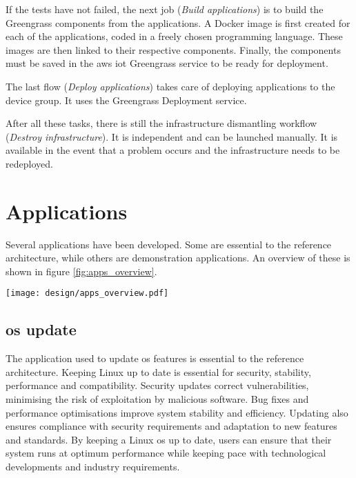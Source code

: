 If the tests have not failed, the next job (\textit{Build applications}) is to build the Greengrass components from the applications. A Docker image is first created for each of the applications, coded in a freely chosen programming language. These images are then linked to their respective components. Finally, the components must be saved in the \gls{aws} \acrshort{iot} Greengrass service to be ready for deployment.

The last flow (\textit{Deploy applications}) takes care of deploying applications to the device group. It uses the Greengrass Deployment service.

After all these tasks, there is still the infrastructure dismantling workflow (\textit{Destroy infrastructure}). It is independent and can be launched manually. It is available in the event that a problem occurs and the infrastructure needs to be redeployed.

\section{Applications}

Several applications have been developed. Some are essential to the reference architecture, while others are demonstration applications. An overview of these is shown in figure \ref{fig:apps_overview}.
\begin{center}
    \begingroup
    \texttt{[image: design/apps\_overview.pdf]}
    \label{fig:apps_overview}
    \endgroup
\end{center}

\subsection{\acrshort{os} update}
The application used to update \acrlong{os} features is essential to the reference architecture. Keeping Linux up to date is essential for security, stability, performance and compatibility. Security updates correct vulnerabilities, minimising the risk of exploitation by malicious software. Bug fixes and performance optimisations improve system stability and efficiency. Updating also ensures compliance with security requirements and adaptation to new features and standards. By keeping a Linux \acrshort{os} up to date, users can ensure that their system runs at optimum performance while keeping pace with technological developments and industry requirements.

